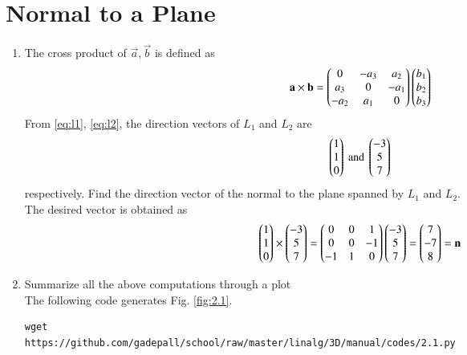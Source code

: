 \documentclass[journal,12pt,twocolumn]{IEEEtran}
\renewcommand\thesection{\arabic{section}}
\begin{document}
\section{Normal to a Plane}
\begin{enumerate}[label=\thesection.\arabic*
,ref=\thesection.\theenumi]
\item The cross product of $\vec{a},\vec{b}$ is defined as
\begin{equation}
\label{eq:cross}
\mathbf{a}\times \mathbf{b} = \begin{pmatrix}0 & -a_3 & a_2 \\ a_3 & 0 & -a_1 \\ -a_2 & a_1 & 0\end{pmatrix}\begin{pmatrix}b_1 \\ b_2 \\ b_3\end{pmatrix}
\end{equation}
From \eqref{eq:l1}, \eqref{eq:l2}, the direction vectors of $L_1$ and $L_2$ are
\begin{equation}
\begin{pmatrix}1 \\ 1 \\ 0\end{pmatrix} \text{ and } \begin{pmatrix}-3 \\ 5 \\ 7\end{pmatrix}
\end{equation}
respectively. Find the direction vector of the normal to the plane spanned by $L_1$ and $L_2$.
\\
\solution The desired vector is obtained as
\begin{align}
\begin{pmatrix}1 \\ 1 \\ 0\end{pmatrix} \times \begin{pmatrix}-3 \\ 5 \\ 7\end{pmatrix} = 
 \begin{pmatrix}0 & 0 & 1 \\ 0 & 0 & -1 \\ -1 & 1 & 0\end{pmatrix}\begin{pmatrix}-3 \\ 5 \\ 7\end{pmatrix}
= \begin{pmatrix}7 \\ -7 \\ 8\end{pmatrix} = \mathbf{n}
\end{align}
\item Summarize all the above computations through a plot 
\\
\solution The following code generates Fig. \ref{fig:2.1}.
\begin{lstlisting}
wget 
https://github.com/gadepall/school/raw/master/linalg/3D/manual/codes/2.1.py
\end{lstlisting}
\begin{figure}[!ht]
\centering

\end{figure}
\end{enumerate}
\end{document}
